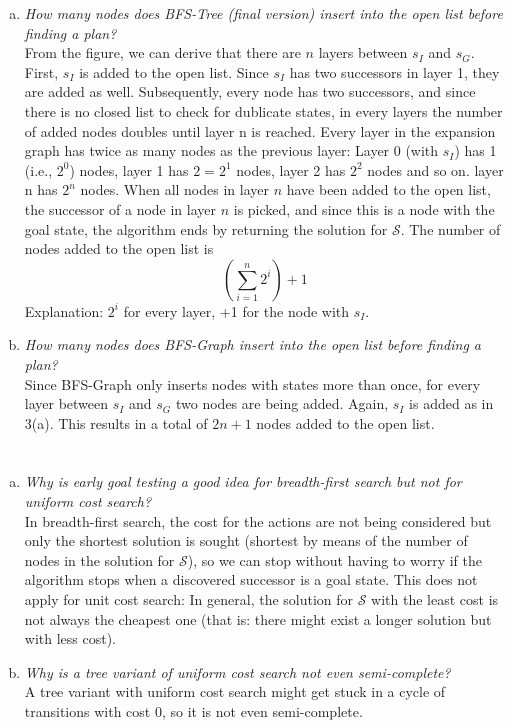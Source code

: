 \documentclass{article} %
\begin{document}
\begin{enumerate}[(a)]
    \item \textit{How many nodes does BFS-Tree (final version) insert
    into the open list before finding a plan?}\\[0.5em]
    From the figure, we can derive that there are $n$ layers
    between $s_I$ and $s_G$. First, $s_I$ is added to the
    open list. Since $s_I$ has two successors in layer 1,
    they are added as well. Subsequently, every node has
    two successors, and since there is no closed list to check
    for dublicate states, in every layers the number of added
    nodes doubles until layer n is reached. Every layer in the
    expansion graph has twice as many nodes as the previous
    layer: Layer 0 (with $s_I$) has 1 (i.e., $2^0$) nodes,
    layer 1 has $2 = 2^1$ nodes, layer 2 has $2^2$ nodes and
    so on. layer n has $2^n$ nodes. When all nodes in layer $n$
    have been added to the open list, the successor of a node
    in layer $n$ is picked, and since this is a node with the
    goal state, the algorithm ends by returning the solution for
    $\mathcal{S}$.
    The number of nodes added to the open list is
    \begin{equation*}
        (\sum_{i=1}^{n} 2^i) + 1
    \end{equation*}
    Explanation: $2^i$ for every layer, +1 for the node with $s_I$.
    
    \item \textit{How many nodes does BFS-Graph insert into the open
    list before finding a plan?}\\[0.5em]
    Since BFS-Graph only inserts nodes with states more than once,
    for every layer between $s_I$ and $s_G$ two nodes are being added.
    Again, $s_I$ is added as in 3(a). This results in a total
    of $2n + 1$ nodes added to the open list.
\end{enumerate}

\section{}
\begin{enumerate}[(a)]
    \item \textit{Why is early goal testing a good idea for breadth-first
    search but not for uniform cost search?}\\[0.5em]
    In breadth-first search, the cost for the actions are
    not being considered but only the shortest solution is
    sought (shortest by means of the number of nodes in the
    solution for $\mathcal{S}$), so we can stop without having
    to worry if the algorithm stops when a discovered successor
    is a goal state.
    This does not apply for unit cost search: In general, the
    solution for $\mathcal{S}$ with the least cost is not always
    the cheapest one (that is: there might exist a longer solution
    but with less cost).
    \item \textit{Why is a tree variant of uniform cost search not even
    semi-complete?}\\[0.5em]
    A tree variant with uniform cost search might get stuck
    in a cycle of transitions with cost 0, so it is not even
    semi-complete.
\end{enumerate}
\end{document}
